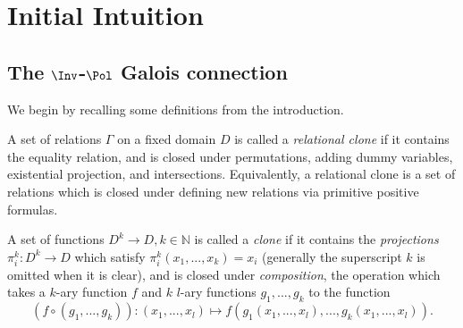 \chapter{Initial Intuition}\label{chapter-intuition}


\section{The $\Inv$-$\Pol$ Galois connection}\label{section-inv-pol}


We begin by recalling some definitions from the introduction.

\begin{defn} A set of relations $\Gamma$ on a fixed domain $D$ is called a \emph{relational clone} if it contains the equality relation, and is closed under permutations, adding dummy variables, existential projection, and intersections. Equivalently, a relational clone is a set of relations which is closed under defining new relations via primitive positive formulas.
\end{defn}

\begin{defn} A set of functions $D^k \rightarrow D, k \in \mathbb{N}$ is called a \emph{clone} if it contains the \emph{projections} $\pi_i^k : D^k \rightarrow D$ which satisfy $\pi_i^k(x_1, ..., x_k) = x_i$ (generally the superscript $k$ is omitted when it is clear), and is closed under \emph{composition}, the operation which takes a $k$-ary function $f$ and $k$ $l$-ary functions $g_1, ..., g_k$ to the function
\[
(f\circ (g_1, ..., g_k)) : (x_1, ..., x_{l}) \mapsto f(g_1(x_1, ..., x_l), ..., g_k(x_{1}, ..., x_{l})).
\]
\end{defn}

